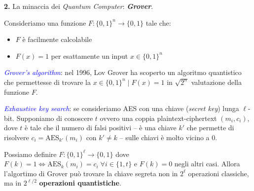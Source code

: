 \newpage

\begin{flushleft}
    \textbf{2.} La minaccia dei \textit{Quantum Computer}: \textbf{\textit{Grover}}\cite{grover}.
    \begin{boxA}
        Consideriamo una funzione $F: \{0, 1\}^n \rightarrow \{0, 1\}$ tale che:
        \begin{itemize}[nosep]
            \item $F$ è facilmente calcolabile
            \item $F(x) = 1$ per esattamente un input $x \in \{0, 1\}^n$
        \end{itemize}

        \textcolor{blue}{\textit{Grover's algorithm}}: nel 1996, Lov Grover ha scoperto un algoritmo quantistico che permettesse di trovare la $x \in \{0, 1\}^n \; | \; F(x) = 1$ in $\sqrt{2^n}$ valutazione della funzione $F$.
    \end{boxA}
    \textcolor{blue}{\textit{Exhaustive key search}}: se consideriamo AES con una chiave (\textit{secret key}) lunga $\ell$-bit. Supponiamo di conoscere $t$ ovvero una coppia plaintext-ciphertext $(m_i, c_i)$, dove $t$ è tale che il numero di falsi positivi -- è una chiave $k'$ che permette di risolvere $c_i = \text{AES}_{k'}(m_i)$ con $k' \neq k$  -- sulle chiavi è molto vicino a 0.

    Possiamo definire $F: \{0, 1\}^{\ell} \rightarrow \{0, 1\}$ dove $F(k) = 1 \Leftrightarrow \text{AES}_k(m_i) = c_i \; \forall i \in \{1, t\}$ e $F(k) = 0$ negli altri casi. Allora l'algortimo di Grover può trovare la chiave segreta non in $2^{\ell}$ operazioni classiche, ma in $2^{{\ell}/2}$ \textbf{operazioni quantistiche}.
\end{flushleft}

